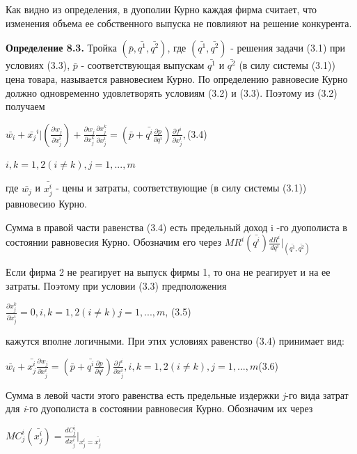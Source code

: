 \documentclass[12pt, 4paper]{book}
\begin{document}
{Как видно из определения, в дуополии Курно каждая фирма считает, что изменения объема ее собственного выпуска не повлияют на решение конкурента.
\par

\textbf{Определение 8.3.} Тройка $(\bar{p},\bar{q^1},\bar{q^2})$, где $(\bar{q^1},\bar{q^2})$ - решения задачи (3.1) при условиях (3.3), $\bar{p}$ - соответствующая выпускам $\bar{q^1}$ и $\bar{q^2}$ (в силу системы (3.1)) цена товара, называется равновесием Курно.
По определению равновесие Курно должно одновременно удовлетворять условиям (3.2) и (3.3). Поэтому из (3.2) получаем
\begin{center}
$\bar{w_i} + \bar{x_{j}}^i|(\frac{\partial w_j}{\partial x_{j}^i})+ \frac{\partial w_j}{\partial x_{j}^k}\frac{\partial x_{j}^k}{\partial x_{j}^i} = (\bar{p} + \bar{q^i}\frac{\partial p}{\partial q^i})\frac{\partial f^i}{\partial x_{j}^i}, $(3.4)
\end{center}
\par

\begin{center}
$i,k=1,2 (i \neq k), j =1,...,m$ 
\end{center}
где $\bar{w_{j}}$ и $\bar{x_{j}^i}$ - цены и затраты, соответствующие (в силу системы (3.1)) равновесию Курно.
\par

Сумма в правой части равенства (3.4) есть предельный доход i -го дуополиста в состоянии равновесия Курно. Обозначим его через
$MR^i(\bar{q^i})\frac{d R^i}{d q^i}|_{(\bar{q^1},\bar{q^2})}$
\par

Если фирма 2 не реагирует на выпуск фирмы 1, то она не реагирует и на ее затраты. Поэтому при условии (3.3) предположения
\begin{center}
$\frac{\partial x_{j}^k}{\partial x_{j}^i}= 0 , i,k=1,2 (i \neq k) j=1,...,m$, (3.5)
\end{center}
кажутся вполне логичными. При этих условиях равенство (3.4) принимает вид:
\begin{center}
$\bar{w_i}+ \bar{x_{j}^i}\frac{\partial w_j}{\partial x_{j}^i} = (\bar{p}+\bar{q^i}\frac{\partial p}{\partial q^i})\frac{\partial f^i}{\partial x_{j}^i}, i,k=1,2 (i\neq k), j=1,...,m$(3.6)
\end{center}
\par

Сумма в левой части этого равенства есть предельные издержки \textit{j}-го вида затрат для \textit{i}-го дуополиста в состоянии равновесия Курно. Обозначим их через
\begin{center}
$MC_{j}^{i}(\bar{x_{j}^i})=\frac{ d C_{j}^i}{d x_{j}^i}|_{x_{j}^i = \bar{x_{j}^i}}$
\end{center}
\par

}
\end{document}
